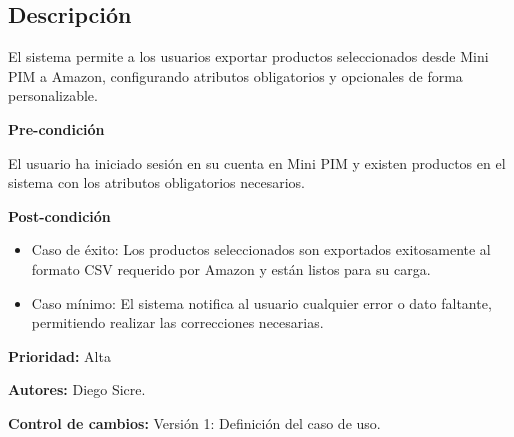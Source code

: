
\subsection*{Descripción}
El sistema permite a los usuarios exportar productos seleccionados desde Mini PIM a Amazon, configurando atributos obligatorios y opcionales de forma personalizable.

\vspace{0.15cm}

\textbf{Pre-condición}\par
El usuario ha iniciado sesión en su cuenta en Mini PIM y existen productos en el sistema con los atributos obligatorios necesarios.

\vspace{0.15cm}

\textbf{Post-condición}
\begin{itemize}
    \item Caso de éxito: Los productos seleccionados son exportados exitosamente al formato CSV requerido por Amazon y están listos para su carga.
    \item Caso mínimo: El sistema notifica al usuario cualquier error o dato faltante, permitiendo realizar las correcciones necesarias.
\end{itemize}

\textbf{Prioridad:}
Alta
\vspace{0.15cm}

\textbf{Autores: }
Diego Sicre.\par
\vspace{0.15cm}

\textbf{Control de cambios: } Versión 1: Definición del caso de uso.

